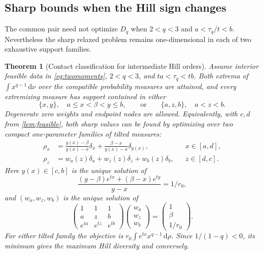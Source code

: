 \documentclass[11pt]{article}
\numberwithin{equation}{section}
\newtheorem{theorem}{Theorem}[section]
\theoremstyle{definition}
\theoremstyle{remark}
\newcommand{\dd}{\,\mathrm d}
\begin{document}
\subsection{Sharp bounds when the Hill sign changes}\label{subsec:intermediate}
The common pair need not optimize $D_q$ when $2<q<3$ and $a<\tau_q/t<b$. Nevertheless the sharp relaxed problem remains one-dimensional in each of two exhaustive support families.

\begin{theorem}[Contact classification for intermediate Hill orders]\label{thm:intermediatehill}
Assume interior feasible data in \eqref{eq:twomoments}, $2<q<3$, and $ta<\tau_q<tb$. Both extrema of $\int x^{q-1}\dd\nu$ over the compatible probability measures are attained, and every extremizing measure has support contained in either
\[
 \{x,y\},\quad a\le x<\beta<y\le b,
 \qquad\text{or}\qquad
 \{a,z,b\},\quad a<z<b.
\]
Degenerate zero weights and endpoint nodes are allowed. Equivalently, with $c,d$ from \cref{lem:feasible}, both sharp values can be found by optimizing over two compact one-parameter families of tilted measures:
\begin{align}
 \rho_x&=\frac{y(x)-\beta}{y(x)-x}\delta_x+
          \frac{\beta-x}{y(x)-x}\delta_{y(x)},&&x\in[a,d],\label{eq:hilltwofamily}\\
 \rho_z&=w_a(z)\delta_a+w_z(z)\delta_z+w_b(z)\delta_b,
          &&z\in[d,c].\label{eq:hillthreefamily}
\end{align}
Here $y(x)\in[c,b]$ is the unique solution of
\begin{equation}\label{eq:hilltwoconstr}
 \frac{(y-\beta)e^{tx}+(\beta-x)e^{ty}}{y-x}=1/r_0,
\end{equation}
and $(w_a,w_z,w_b)$ is the unique solution of
\begin{equation}\label{eq:hillthreeconstr}
 \begin{pmatrix}1&1&1\\a&z&b\\e^{ta}&e^{tz}&e^{tb}\end{pmatrix}
 \begin{pmatrix}w_a\\w_z\\w_b\end{pmatrix}
 =\begin{pmatrix}1\\\beta\\1/r_0\end{pmatrix}.
\end{equation}
For either tilted family the objective is
$r_0\int e^{tx}x^{q-1}\dd\rho$. Since $1/(1-q)<0$, its minimum gives the maximum Hill diversity and conversely.
\end{theorem}
\end{document}
